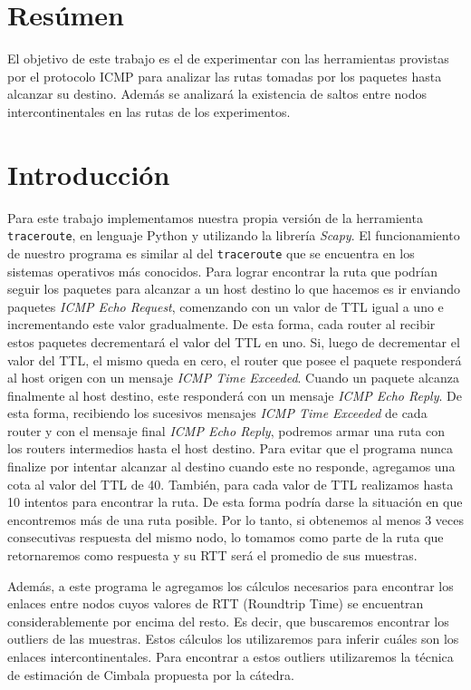 \section{Resúmen}

El objetivo de este trabajo es el de experimentar con las herramientas provistas por el protocolo ICMP para analizar las rutas tomadas por los paquetes hasta alcanzar su destino. Además se analizará la existencia de saltos entre nodos intercontinentales en las rutas de los experimentos.

\section{Introducción}

Para este trabajo implementamos nuestra propia versión de la herramienta \texttt{traceroute}, en lenguaje Python y utilizando la librería \emph{Scapy}. El funcionamiento de nuestro programa es similar al del \texttt{traceroute} que se encuentra en los sistemas operativos más conocidos. Para lograr encontrar la ruta que podrían seguir los paquetes para alcanzar a un host destino lo que hacemos es ir enviando paquetes \emph{ICMP Echo Request}, comenzando con un valor de TTL igual a uno e incrementando este valor gradualmente. De esta forma, cada router al recibir estos paquetes decrementará el valor del TTL en uno. Si, luego de decrementar el valor del TTL, el mismo queda en cero, el router que posee el paquete responderá al host origen con un mensaje \emph{ICMP Time Exceeded}. Cuando un paquete alcanza finalmente al host destino, este responderá con un mensaje \emph{ICMP Echo Reply}. De esta forma, recibiendo los sucesivos mensajes \emph{ICMP Time Exceeded} de cada router y con el mensaje final \emph{ICMP Echo Reply}, podremos armar una ruta con los routers intermedios hasta el host destino.
Para evitar que el programa nunca finalize por intentar alcanzar al destino cuando este no responde, agregamos una cota al valor del TTL de 40.
También, para cada valor de TTL realizamos hasta 10 intentos para encontrar la ruta. De esta forma podría darse la situación en que encontremos más de una ruta posible. Por lo tanto, si obtenemos al menos 3 veces consecutivas respuesta del mismo nodo, lo tomamos como parte de la ruta que retornaremos como respuesta y su RTT será el promedio de sus muestras.

Además, a este programa le agregamos los cálculos necesarios para encontrar los enlaces entre nodos cuyos valores de RTT (Roundtrip Time) se encuentran considerablemente por encima del resto. Es decir, que buscaremos encontrar los outliers de las muestras. Estos cálculos los utilizaremos para inferir cuáles son los enlaces intercontinentales. Para encontrar a estos outliers utilizaremos la técnica de estimación de Cimbala propuesta por la cátedra.

